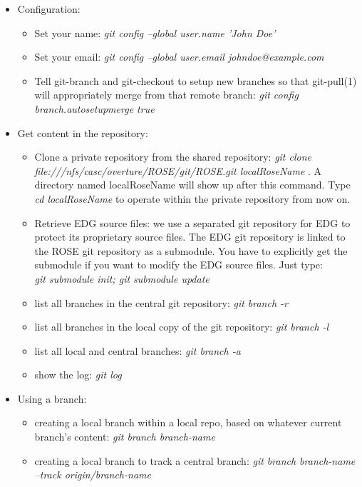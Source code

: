 \begin{itemize}

\item Configuration:
  \begin{itemize}
          \item Set your name: \textit{git config --global user.name 'John Doe' }
	  \item Set your email: \textit{git config --global user.email johndoe@example.com}
	  \item Tell git-branch and git-checkout to setup new branches so that git-pull(1)
    will appropriately merge from that remote branch: \textit{git config branch.autosetupmerge true}
   \end{itemize}       
\item Get content in the repository:
  \begin{itemize}
          \item Clone a private repository from the shared repository: \textit{git clone 
          file:///nfs/casc/overture/ROSE/git/ROSE.git localRoseName} . A
          directory named localRoseName will show up after this 
           command. Type \textit{cd localRoseName} to operate within the private repository from now on.
           \item Retrieve EDG source files: we use a separated git
           repository for EDG to protect its proprietary source files. The
           EDG git repository is linked to the ROSE git repository as a
           submodule. You have to explicitly get the submodule if you want to
           modify the EDG source files. Just type:
           \\ \textit{git submodule init; git submodule update}
          \item list all branches in the central git repository: \textit{git branch -r}
          \item list all branches in the local copy of the git repository: \textit{git branch -l}
          \item list all local and central branches: \textit{git branch -a}

          \item show the log: \textit{git log} 
   \end{itemize}       
\item Using a branch:
   \begin{itemize}
          \item creating a local branch within a local repo, based on
          whatever current branch's content: \textit{git branch branch-name} 
          \item creating a local branch to track a central branch: \textit{git branch branch-name --track origin/branch-name} 


\end{itemize}
\end{itemize}
